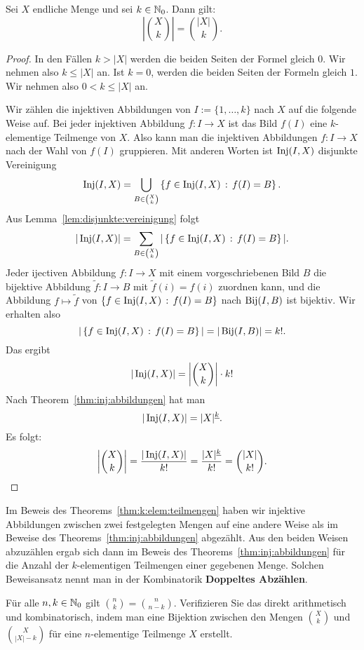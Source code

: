 \begin{thm} \label{thm:k:elem:teilmengen} 
		Sei $X$ endliche Menge und sei $k \in \mathbb{N}_0$. Dann gilt: 
		\[
				\left| \binom{X}{k} \right| = \binom{|X|}{k}. 
		\]
\end{thm} 
\begin{proof} 
	In den Fällen $k > |X|$ werden die beiden Seiten der Formel gleich $0$. Wir nehmen also $k \le |X|$ an. Ist $k=0$, werden die beiden Seiten der Formeln gleich $1$. Wir nehmen also $0 < k \le |X|$ an. 
	
	Wir zählen die injektiven Abbildungen von $I:=\{1,\ldots,k\}$ nach $X$ auf die folgende  Weise auf. Bei jeder injektiven Abbildung $f : I \to X$ ist das Bild $f(I)$ eine $k$-elementige Teilmenge von $X$. Also kann man die injektiven Abbildungen $f: I \to X$  nach der Wahl von $f(I)$ gruppieren. Mit anderen Worten ist $\operatorname{Inj}(I,X)$ disjunkte Vereinigung
	\[
		\operatorname{Inj}(I,X)  = \bigcup_{B \in \binom{X}{k} } \left\{ f \in \operatorname{Inj}(I,X) \,:\, f(I) = B \right\}. 
	\]
	Aus Lemma~\ref{lem:disjunkte:vereinigung} folgt
	\[
		|\operatorname{Inj}(I,X) | = \sum_{B \in \binom{X}{k} } | \left\{ f \in \operatorname{Inj}(I,X) \,:\, f(I) = B \right\}|. 
	\]
	Jeder ijectiven Abbildung $ f: I \to X$ mit einem vorgeschriebenen Bild $B$ 
	die bijektive Abbildung $\tilde{f} : I \to B$ mit $\tilde{f}(i) = f(i)$ zuordnen kann, und die Abbildung $f \mapsto \tilde{f}$ von $\left\{ f \in \operatorname{Inj}(I,X) \,:\, f(I) = B \right\}$ nach $\operatorname{Bij}(I,B)$ ist bijektiv. 
	Wir erhalten also 
	\[
			| \left\{ f \in \operatorname{Inj}(I,X) \,:\, f(I) = B \right\}| = |\operatorname{Bij}(I,B)| = k!. 
	\]
	Das ergibt
	\[
		|\operatorname{Inj}(I,X) | = \left| \binom{X}{k} \right| \cdot k!
	\]
	Nach Theorem~\ref{thm:inj:abbildungen} hat man 
	\[
		|\operatorname{Inj}(I,X)| = |X|^{\underline{k}}. 
	\]
	Es folgt: 
	\[
		\left| \binom{X}{k} \right| = \frac{|\operatorname{Inj}(I,X) |}{k!} = \frac{|X|^{\underline{k}}}{k!} = \binom{|X|}{k!}. 
	\]
\end{proof} 

\begin{bem} 
	Im Beweis des  Theorems~\ref{thm:k:elem:teilmengen} haben wir injektive Abbildungen zwischen zwei festgelegten Mengen auf eine andere Weise als im Beweise des Theorems~\ref{thm:inj:abbildungen} abgezählt. Aus den beiden Weisen abzuzählen ergab sich dann im Beweis des Theorems~\ref{thm:inj:abbildungen} für die Anzahl der $k$-elementigen Teilmengen einer gegebenen Menge. Solchen Beweisansatz nennt man in der Kombinatorik \textbf{Doppeltes Abzählen}. 
\end{bem} 

\begin{aufg}
	Für alle $n,k \in \mathbb{N}_0$ gilt $\binom{n}{k} = \binom{n}{n-k}$. Verifizieren Sie das direkt arithmetisch und kombinatorisch, indem man eine Bijektion zwischen 
	den Mengen $\binom{X}{k}$ und $\binom{X}{|X|-k}$ für eine $n$-elementige Teilmenge $X$ erstellt. 
\end{aufg} 


